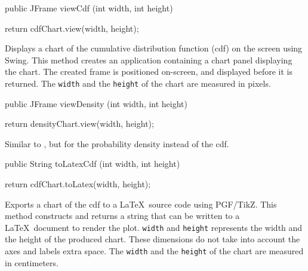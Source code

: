\begin{code}

   public JFrame viewCdf (int width, int height) \begin{hide} {
      return cdfChart.view(width, height);
   }\end{hide}
\end{code}
\begin{tabb}
   Displays a chart of the cumulative distribution function (cdf) on the screen
   using Swing. This method creates an application containing a chart panel
   displaying the chart. The created frame is positioned on-screen, and
   displayed before it is returned. The \texttt{width} and the \texttt{height}
   of the chart are measured in pixels.
\end{tabb}
\begin{htmlonly}
\end{htmlonly}
\begin{code}

   public JFrame viewDensity (int width, int height) \begin{hide} {
      return densityChart.view(width, height);
   }\end{hide}
\end{code}
\begin{tabb}
    Similar to , but for the probability density instead
   of the cdf.
\end{tabb}
\begin{htmlonly}
\end{htmlonly}
\begin{code}

   public String toLatexCdf (int width, int height) \begin{hide} {
      return cdfChart.toLatex(width, height);
   }\end{hide}
\end{code}
\begin{tabb}
   Exports a chart of the cdf to a \LaTeX\ source code using PGF/TikZ.
   This method constructs and returns a string that can be written to
   a \LaTeX\ document to render the plot. \texttt{width} and \texttt{height}
   represents the width and the height of the produced chart. These dimensions
   do not take into account the axes and labels extra space. The \texttt{width}
   and the \texttt{height} of the chart are measured in centimeters.
\end{tabb}
